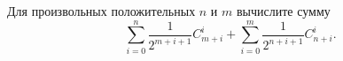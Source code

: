 \documentclass{article}
\begin{document}
Для произвольных положительных $n$ и $m$ вычислите сумму
$$\sum\limits_{i=0}^n \frac{1}{2^{m+i+1}} C_{m+i}^i + \sum\limits_{i=0}^m \frac{1}{2^{n+i+1}} C_{n+i}^i.$$
\end{document}
